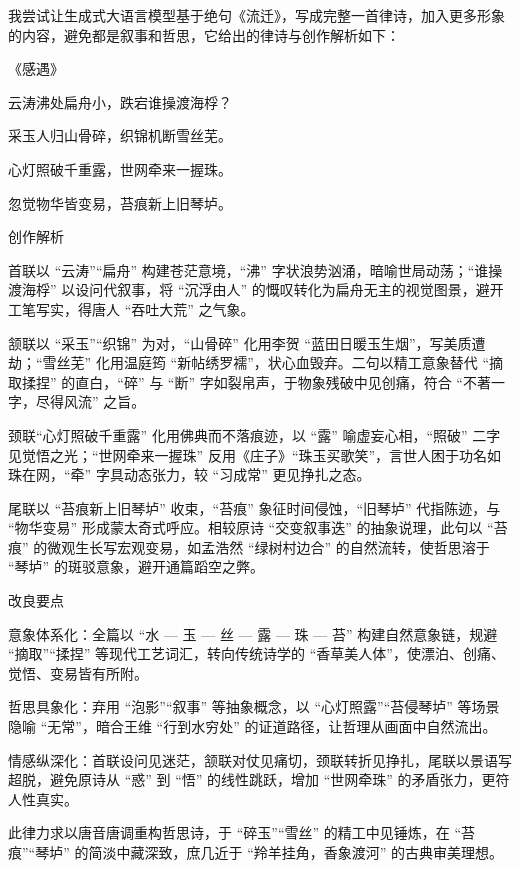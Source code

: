 \documentclass{article}
\begin{document}
我尝试让生成式大语言模型基于绝句《流迁》，写成完整一首律诗，加入更多形象的内容，避免都是叙事和哲思，它给出的律诗与创作解析如下：

《感遇》

云涛沸处扁舟小，跌宕谁操渡海桴？

采玉人归山骨碎，织锦机断雪丝芜。

心灯照破千重露，世网牵来一握珠。

忽觉物华皆变易，苔痕新上旧琴垆。

创作解析

首联以 “云涛”“扁舟” 构建苍茫意境，“沸” 字状浪势汹涌，暗喻世局动荡；“谁操渡海桴” 以设问代叙事，将 “沉浮由人” 的慨叹转化为扁舟无主的视觉图景，避开工笔写实，得唐人 “吞吐大荒” 之气象。

颔联以 “采玉”“织锦” 为对，“山骨碎” 化用李贺 “蓝田日暖玉生烟”，写美质遭劫；“雪丝芜” 化用温庭筠 “新帖绣罗襦”，状心血毁弃。二句以精工意象替代 “摘取揉捏” 的直白，“碎” 与 “断” 字如裂帛声，于物象残破中见创痛，符合 “不著一字，尽得风流” 之旨。

颈联“心灯照破千重露” 化用佛典而不落痕迹，以 “露” 喻虚妄心相，“照破” 二字见觉悟之光；“世网牵来一握珠” 反用《庄子》“珠玉买歌笑”，言世人困于功名如珠在网，“牵” 字具动态张力，较 “习成常” 更见挣扎之态。

尾联以 “苔痕新上旧琴垆” 收束，“苔痕” 象征时间侵蚀，“旧琴垆” 代指陈迹，与 “物华变易” 形成蒙太奇式呼应。相较原诗 “交变叙事迭” 的抽象说理，此句以 “苔痕” 的微观生长写宏观变易，如孟浩然 “绿树村边合” 的自然流转，使哲思溶于 “琴垆” 的斑驳意象，避开通篇蹈空之弊。

改良要点

意象体系化：全篇以 “水 — 玉 — 丝 — 露 — 珠 — 苔” 构建自然意象链，规避 “摘取”“揉捏” 等现代工艺词汇，转向传统诗学的 “香草美人体”，使漂泊、创痛、觉悟、变易皆有所附。

哲思具象化：弃用 “泡影”“叙事” 等抽象概念，以 “心灯照露”“苔侵琴垆” 等场景隐喻 “无常”，暗合王维 “行到水穷处” 的证道路径，让哲理从画面中自然流出。

情感纵深化：首联设问见迷茫，颔联对仗见痛切，颈联转折见挣扎，尾联以景语写超脱，避免原诗从 “惑” 到 “悟” 的线性跳跃，增加 “世网牵珠” 的矛盾张力，更符人性真实。

此律力求以唐音唐调重构哲思诗，于 “碎玉”“雪丝” 的精工中见锤炼，在 “苔痕”“琴垆” 的简淡中藏深致，庶几近于 “羚羊挂角，香象渡河” 的古典审美理想。
\end{document}
